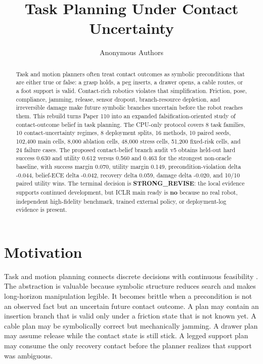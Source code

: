 \documentclass{article}
\title{Task Planning Under Contact Uncertainty}
\author{Anonymous Authors}
\newcommand{\method}{contact-belief branch audit v5}
\newcommand{\terminal}{\textbf{STRONG\_REVISE}}
\begin{document}
\maketitle

\begin{abstract}
Task and motion planners often treat contact outcomes as symbolic preconditions that are either true or false: a grasp holds, a peg inserts, a drawer opens, a cable routes, or a foot support is valid. Contact-rich robotics violates that simplification. Friction, pose, compliance, jamming, release, sensor dropout, branch-resource depletion, and irreversible damage make future symbolic branches uncertain before the robot reaches them. This rebuild turns Paper 110 into an expanded falsification-oriented study of contact-outcome belief in task planning. The CPU-only protocol covers 8 task families, 10 contact-uncertainty regimes, 8 deployment splits, 16 methods, 10 paired seeds, 102,400 main cells, 8,000 ablation cells, 48,000 stress cells, 51,200 fixed-risk cells, and 24 failure cases. The proposed \method{} obtains held-out hard success 0.630 and utility 0.612 versus 0.560 and 0.463 for the strongest non-oracle baseline, with success margin 0.070, utility margin 0.149, precondition-violation delta -0.044, belief-ECE delta -0.042, recovery delta 0.059, damage delta -0.020, and 10/10 paired utility wins. The terminal decision is \terminal: the local evidence supports continued development, but ICLR main ready is \textbf{no} because no real robot, independent high-fidelity benchmark, trained external policy, or deployment-log evidence is present.
\end{abstract}

\section{Motivation}
Task and motion planning connects discrete decisions with continuous feasibility \citep{kaelbling2011hierarchical,garrett2021integrated,garrett2020pddlstream,toussaint2015logic,dantam2018incremental}. The abstraction is valuable because symbolic structure reduces search and makes long-horizon manipulation legible. It becomes brittle when a precondition is not an observed fact but an uncertain future contact outcome. A plan may contain an insertion branch that is valid only under a friction state that is not known yet. A cable plan may be symbolically correct but mechanically jamming. A drawer plan may assume release while the contact state is still stick. A legged support plan may consume the only recovery contact before the planner realizes that support was ambiguous.
\end{document}
